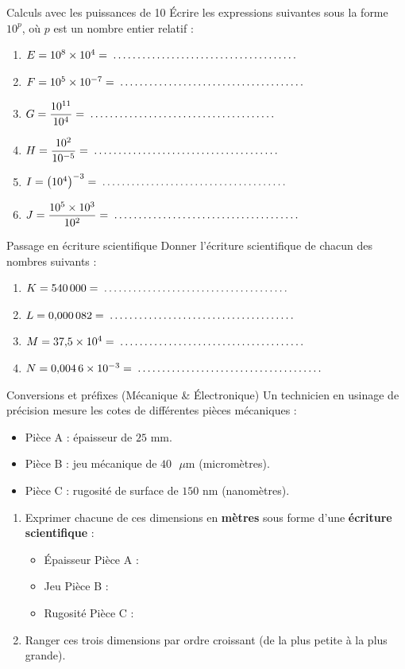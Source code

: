 \begin{exercice}[3 pts]{\capRealiser}{Calculs avec les puissances de 10}
Écrire les expressions suivantes sous la forme $10^p$, où $p$ est un nombre entier relatif :
\begin{enumerate}
    \item $E = 10^8 \times 10^4 = \pointille[6cm]$
    \item $F = 10^5 \times 10^{-7} = \pointille[6cm]$
    \item $G = \dfrac{10^{11}}{10^4} = \pointille[6cm]$
    \item $H = \dfrac{10^2}{10^{-5}} = \pointille[6cm]$
    \item $I = \left(10^4\right)^{-3} = \pointille[6cm]$
    \item $J = \dfrac{10^5 \times 10^3}{10^2} = \pointille[6cm]$
\end{enumerate}
\end{exercice}

\begin{exercice}[3 pts]{\capRealiser}{Passage en écriture scientifique}
Donner l'écriture scientifique de chacun des nombres suivants :
\begin{enumerate}
    \item $K = 540\,000 = \pointille[6cm]$
    \item $L = 0{,}000\,082 = \pointille[6cm]$
    \item $M = 37{,}5 \times 10^4 = \pointille[6cm]$
    \item $N = 0{,}004\,6 \times 10^{-3} = \pointille[6cm]$
\end{enumerate}
\end{exercice}

\begin{exercice}[4 pts]{\capAnalyser}{Conversions et préfixes (Mécanique \& Électronique)}
Un technicien en usinage de précision mesure les cotes de différentes pièces mécaniques :
\begin{itemize}
    \item Pièce A : épaisseur de $25\text{ mm}$.
    \item Pièce B : jeu mécanique de $40\text{ }\mu\text{m}$ (micromètres).
    \item Pièce C : rugosité de surface de $150\text{ nm}$ (nanomètres).
\end{itemize}

\begin{enumerate}
    \item Exprimer chacune de ces dimensions en \textbf{mètres} sous forme d'une \textbf{écriture scientifique} :
    \begin{itemize}
        \item Épaisseur Pièce A : \pointille[6cm]
        \item Jeu Pièce B : \pointille[6cm]
        \item Rugosité Pièce C : \pointille[6cm]
    \end{itemize}
    \item Ranger ces trois dimensions par ordre croissant (de la plus petite à la plus grande).
\end{enumerate}
\lignesreponse[4]
\end{exercice}

